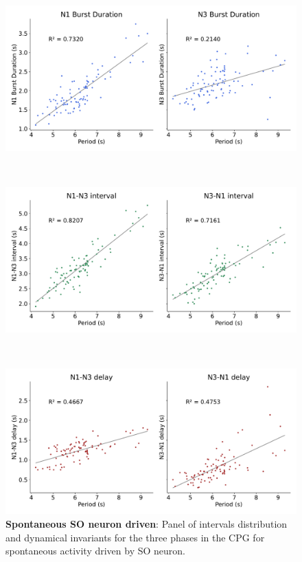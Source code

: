 \begin{figure}[htbp]
\begin{minipage}{0.9\textwidth}
\begin{minipage}[b]{0.53\textwidth}
			\centering
			\begin{minipage}[b]{\textwidth}
				\centering
				\includegraphics[width=\textwidth]{./invariants/data/SUSSEX/prep4_so_driven_2/images/spontaneous_durations.pdf}
			\end{minipage}\\
			\begin{minipage}[b]{\textwidth}
				\centering
				\includegraphics[width=\textwidth]{./invariants/data/SUSSEX/prep4_so_driven_2/images/spontaneous_intervals.pdf}
			\end{minipage}\\
			\begin{minipage}[b]{\textwidth}
				\centering
				\includegraphics[width=\textwidth]{./invariants/data/SUSSEX/prep4_so_driven_2/images/spontaneous_delays.pdf}
			\end{minipage}
		\end{minipage}
	\end{minipage}
	\caption{\textbf{Spontaneous SO neuron driven}: Panel of intervals distribution and dynamical invariants for the three phases in the CPG for spontaneous activity driven by SO neuron.}
	\label{fig:so spontaneous invariants}
\end{figure}

